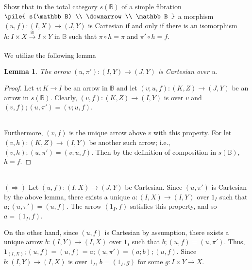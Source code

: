 \documentclass{article}
\newtheorem{lemma}{Lemma}
\newcommand{\vrt}[2]{
\pile{
#1 \\
\downarrow \\
#2
}
}
\begin{document}
Show that in the total category $s(\mathbb B)$ of a simple fibration $\vrt{s(\mathbb B)}{\mathbb B}$ a morphism
$(u,f) : (I,X) \to (J,Y)$ is Cartesian if and only if there is an isomorphism $h : I \times X \overset{\cong}{\to} I \times Y$
in $\mathbb B$ such that $\pi \circ h = \pi$ and $\pi' \circ h = f$.
\\~\\
We utilize the following lemma
\begin{lemma}
\label{lemma:one}
The arrow $(u, \pi') : (I,Y) \to (J,Y)$ is Cartesian over $u$.
\end{lemma}

\begin{proof}
Let $v : K \to I$ be an arrow in $\mathbb B$ and let $(v;u,f) : (K,Z) \to (J,Y)$ be an arrow in $s(\mathbb B)$.
Clearly, $(v,f) : (K,Z) \to (I,Y)$ is over $v$ and $(v,f);(u,\pi') = (v;u,f)$.\\~\\
\begin{center}
\end{center}

Furthermore, $(v,f)$ is the unique arrow above $v$ with this property. For let $(v,h) : (K,Z) \to (I,Y)$ be another such
arrow; i.e., $(v,h);(u,\pi') = (v;u,f)$. Then by the definition of composition in $s(\mathbb B)$, $h = f$. 

\end{proof}
~\\
$(\Rightarrow)$ Let $(u,f) : (I,X) \to (J,Y)$ be Cartesian. 
Since $(u,\pi')$ is Cartesian by the above lemma, there exists a unique $a : (I,X) \to (I,Y)$ over $1_I$ 
such that $a;(u,\pi') = (u,f)$. The arrow $(1_I,f)$ satisfies this property, and so $a = (1_I, f)$. 

On the other hand, since $(u,f)$ is Cartesian by assumption, 
there exists a unique arrow $b : (I,Y) \to (I,X)$ over $1_I$ such that
$b;(u,f) = (u,\pi')$. Thus, $1_{(I,X)};(u,f) = (u,f) = a;(u,\pi') = (a;b);(u,f)$. 
Since $b : (I,Y) \to (I,X)$ is over $1_I$, $b = (1_I, g)$ for some $g : I \times Y \to X$.
\end{document}
